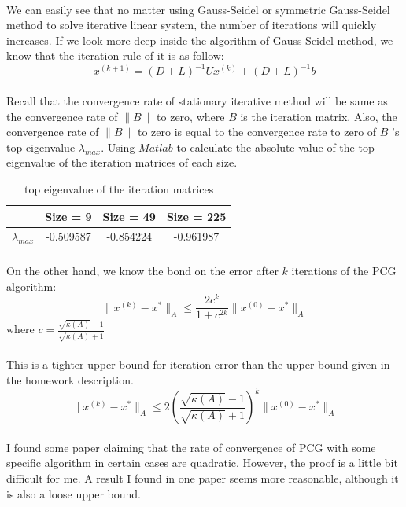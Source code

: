\documentclass{article}
\begin{document}
\paragraph{}
We can easily see that no matter using Gauss-Seidel or symmetric Gauss-Seidel method to solve iterative linear system, the number of iterations will quickly increases.
If we look more deep inside the algorithm of Gauss-Seidel method, we know that the iteration rule of it is as follow:
$$x^{(k+1)} = (D+L)^{-1}Ux^{(k)} + (D+L)^{-1}b$$

\paragraph{}
Recall that the convergence rate of stationary iterative method will be same as the convergence rate of $\|B\|$ to zero, where $B$ is the iteration matrix. Also, the convergence rate of $\|B\|$ to zero is equal to the convergence rate to zero of $B$ 's top eigenvalue $\lambda_{max}$. Using $Matlab$ to calculate the absolute value of the top eigenvalue of the iteration matrices of each size. 
\begin{table}[h]
\begin{center}
\begin{tabular}[c]{lccc}
\hline
 & Size = 9 & Size = 49 & Size = 225 \\
\hline
$\lambda_{max}$ & -0.509587 & -0.854224& -0.961987 \\
\hline
\end{tabular}
\caption{top eigenvalue of the iteration matrices}
\end{center}
\end{table}

\paragraph{}
On the other hand, we know the bond on the error after $k$ iterations of the PCG algorithm:\cite[pp.155-156]{QSS07}
$$\|x^{(k)}-x^*\|_A \leq \frac{2c^k}{1+c^{2k}}\|x^{(0)}-x^*\|_A$$
where
$c = \frac{\sqrt{\kappa(A)}-1}{\sqrt{\kappa(A)}+1}$
\paragraph{}
This is a tighter upper bound for iteration error than the upper bound given in the homework description.
$$\|x^{(k)}-x^*\|_A \leq 2(\frac{\sqrt{\kappa(A)}-1}{\sqrt{\kappa(A)}+1})^k\|x^{(0)}-x^*\|_A$$

\paragraph{}
I found some paper claiming that the rate of convergence of PCG with some specific algorithm in certain cases are quadratic. However, the proof is a little bit difficult for me. A result I found in one paper\cite{CG} seems more reasonable, although it is also a loose upper bound. 
\end{document}
